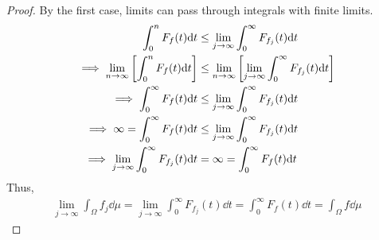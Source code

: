 \documentclass[12pt]{article}
\theoremstyle{plain}
\begin{document}
\begin{proof}
    By the first case, limits can pass through integrals with finite limits.
    \begin{align*}
        \int_0^n F_f(t) \dd t &\leq \lim_{j\rightarrow \infty} \int_0^\infty F_{f_j}(t) \dd t \\
        \implies \lim_{n \rightarrow \infty} \qty[\int_0^n F_f(t) \dd t] &\leq \lim_{n \rightarrow \infty} \qty[\lim_{j\rightarrow \infty} \int_0^\infty F_{f_j}(t) \dd t] \\
        \implies \int_0^\infty F_f(t) \dd t &\leq \lim_{j\rightarrow \infty} \int_0^\infty F_{f_j}(t) \dd t \\
        \implies \infty = \int_0^\infty F_f(t) \dd t &\leq \lim_{j\rightarrow \infty} \int_0^\infty F_{f_j}(t) \dd t \\
        \implies \lim_{j\rightarrow \infty} \int_0^\infty F_{f_j}(t) \dd t &= \infty = \int_0^\infty F_f(t) \dd t
    \end{align*}
    Thus,
    \begin{align*}
        \lim_{j\rightarrow \infty} \int_\Omega f_j \dd\mu = \lim_{j\rightarrow \infty}\int_0^\infty F_{f_j}(t) \dd t = \int_0^\infty F_f(t) \dd t = \int_\Omega f \dd \mu
    \end{align*}
\end{proof}
\end{document}
